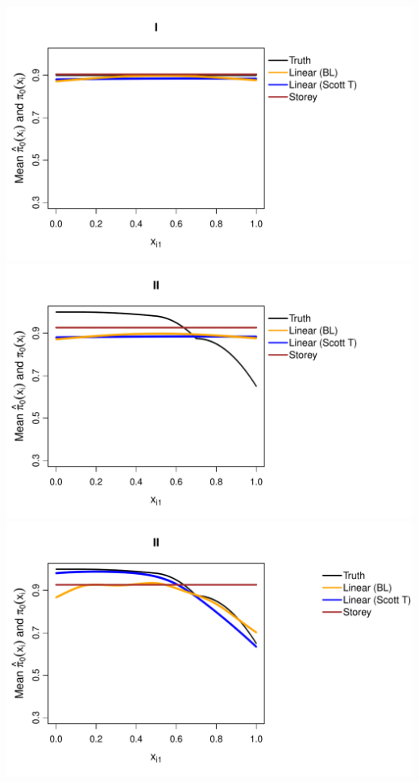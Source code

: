 \documentclass{article}\usepackage[]{graphicx}\usepackage[]{color}
\makeatletter
\def\maxwidth{ %
  \ifdim\Gin@nat@width>\linewidth
    \linewidth
  \else
    \Gin@nat@width
  \fi
}
\newenvironment{knitrout}{}{} %
\makeatother
\begin{document}
\begin{knitrout}
{\centering \includegraphics[width=\maxwidth]{Figures/plot_of_mean_estimates_norm-1} 
\includegraphics[width=\maxwidth]{Figures/plot_of_mean_estimates_norm-2} 
\includegraphics[width=\maxwidth]{Figures/plot_of_mean_estimates_norm-3} 
}
\end{knitrout}
\end{document}

